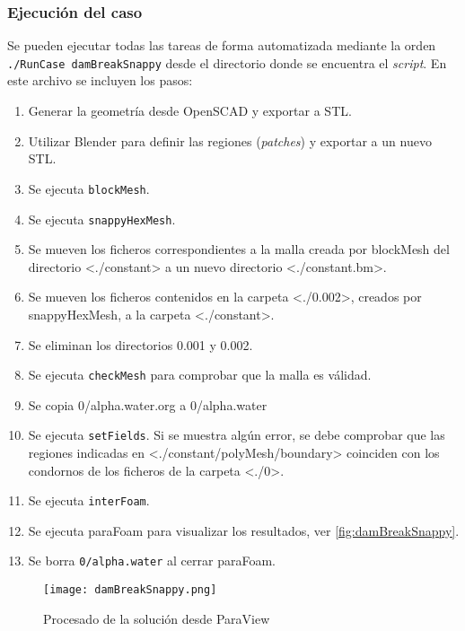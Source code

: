 \subsubsection{Ejecución del caso}\label{header-n927}

Se pueden ejecutar todas las tareas de forma automatizada mediante la
orden \texttt{./RunCase\ damBreakSnappy} desde el directorio donde se
encuentra el \emph{script}. En este archivo se incluyen los pasos:

\begin{enumerate}
\def\labelenumi{\arabic{enumi}.}
\item
  Generar la geometría desde OpenSCAD y exportar a STL.
\item
  Utilizar Blender para definir las regiones (\emph{patches}) y exportar
  a un nuevo STL.
\item
  Se ejecuta \texttt{blockMesh}.
\item
  Se ejecuta \texttt{snappyHexMesh}.
\item
  Se mueven los ficheros correspondientes a la malla creada por
  blockMesh del directorio \textless{}./constant\textgreater{} a un
  nuevo directorio \textless{}./constant.bm\textgreater{}.
\item
  Se mueven los ficheros contenidos en la carpeta
  \textless{}./0.002\textgreater{}, creados por snappyHexMesh, a la
  carpeta \textless{}./constant\textgreater{}.
\item
  Se eliminan los directorios 0.001 y 0.002.
\item
  Se ejecuta \texttt{checkMesh} para comprobar que la malla es válidad.
\item
  Se copia 0/alpha.water.org a 0/alpha.water
\item
  Se ejecuta \texttt{setFields}. Si se muestra algún error, se debe
  comprobar que las regiones indicadas en
  \textless{}./constant/polyMesh/boundary\textgreater{} coinciden con
  los condornos de los ficheros de la carpeta
  \textless{}./0\textgreater{}.
\item
  Se ejecuta \texttt{interFoam}.
\item
  Se ejecuta paraFoam para visualizar los resultados, ver \autoref{fig:damBreakSnappy}.
\item
  Se borra \texttt{0/alpha.water} al cerrar paraFoam.
\end{enumerate}

\begin{figure}
\centering
\texttt{[image: damBreakSnappy.png]}
\caption{Procesado de la solución desde ParaView}
\label{fig:damBreakSnappy}
\end{figure}

